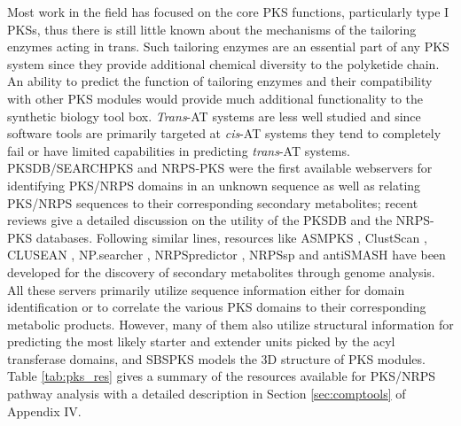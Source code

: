 	Most work in the field has focused on the core PKS functions, particularly type I PKSs, thus there is still little known about the mechanisms of the tailoring enzymes acting in trans. Such tailoring enzymes are an essential part of any PKS system since they provide additional chemical diversity to the polyketide chain. An ability to predict the function of tailoring enzymes and their compatibility with other PKS modules would provide much additional functionality to the synthetic biology tool box. \textit{Trans}-AT systems are less well studied and since software tools are primarily targeted at \textit{cis}-AT systems they tend to completely fail or have limited capabilities in predicting \textit{trans}-AT systems.
%	
	PKSDB/SEARCHPKS and NRPS-PKS were the first available webservers for identifying PKS/NRPS domains in an unknown sequence as well as relating PKS/NRPS sequences to their corresponding secondary metabolites; recent reviews \parencite{Jenke-Kodama2009, Bachmann2009} give a detailed discussion on the utility of the PKSDB and the NRPS-PKS databases. Following similar lines, resources like ASMPKS \parencite{Tae2007}, ClustScan \parencite{Starcevic2008}, CLUSEAN \parencite{Weber2009}, NP.searcher \parencite{Li2009}, NRPSpredictor \parencite{Rottig2011}, NRPSsp \parencite{Prieto2012} and antiSMASH \parencite{Medema2011} have been developed for the discovery of secondary metabolites through genome analysis. All these servers primarily utilize sequence information either for domain identification or to correlate the various PKS domains to their corresponding metabolic products. However, many of them also utilize structural information for predicting the most likely starter and extender units picked by the acyl transferase domains, and SBSPKS models the 3D structure of PKS modules. Table  \ref{tab:pks_res} gives a summary of the resources available for PKS/NRPS pathway analysis with a detailed description in Section \ref{sec:comptools} of Appendix IV.
%		
\newpage		
